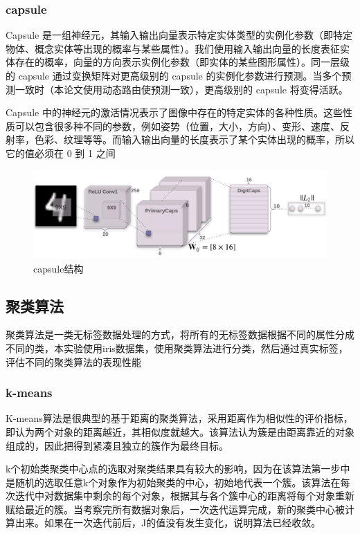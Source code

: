 \documentclass{article}
\begin{document}
	\subsubsection{capsule}
	Capsule 是一组神经元，其输入输出向量表示特定实体类型的实例化参数（即特定物体、概念实体等出现的概率与某些属性）。我们使用输入输出向量的长度表征实体存在的概率，向量的方向表示实例化参数（即实体的某些图形属性）。同一层级的 capsule 通过变换矩阵对更高级别的 capsule 的实例化参数进行预测。当多个预测一致时（本论文使用动态路由使预测一致），更高级别的 capsule 将变得活跃。
	
	Capsule 中的神经元的激活情况表示了图像中存在的特定实体的各种性质。这些性质可以包含很多种不同的参数，例如姿势（位置，大小，方向）、变形、速度、反射率，色彩、纹理等等。而输入输出向量的长度表示了某个实体出现的概率，所以它的值必须在 0 到 1 之间
	
	\begin{figure}[htbp]
	\centering\includegraphics[scale=0.3]{capsule}
	\caption{capsule结构}\label{fig:3}
	\end{figure}
	\subsection{聚类算法}
	聚类算法是一类无标签数据处理的方式，将所有的无标签数据根据不同的属性分成不同的类，本实验使用iris数据集，使用聚类算法进行分类，然后通过真实标签，评估不同的聚类算法的表现性能
	\subsubsection{k-means}
	K-means算法是很典型的基于距离的聚类算法，采用距离作为相似性的评价指标，即认为两个对象的距离越近，其相似度就越大。该算法认为簇是由距离靠近的对象组成的，因此把得到紧凑且独立的簇作为最终目标。
	
	k个初始类聚类中心点的选取对聚类结果具有较大的影响，因为在该算法第一步中是随机的选取任意k个对象作为初始聚类的中心，初始地代表一个簇。该算法在每次迭代中对数据集中剩余的每个对象，根据其与各个簇中心的距离将每个对象重新赋给最近的簇。当考察完所有数据对象后，一次迭代运算完成，新的聚类中心被计算出来。如果在一次迭代前后，J的值没有发生变化，说明算法已经收敛。
\end{document}
